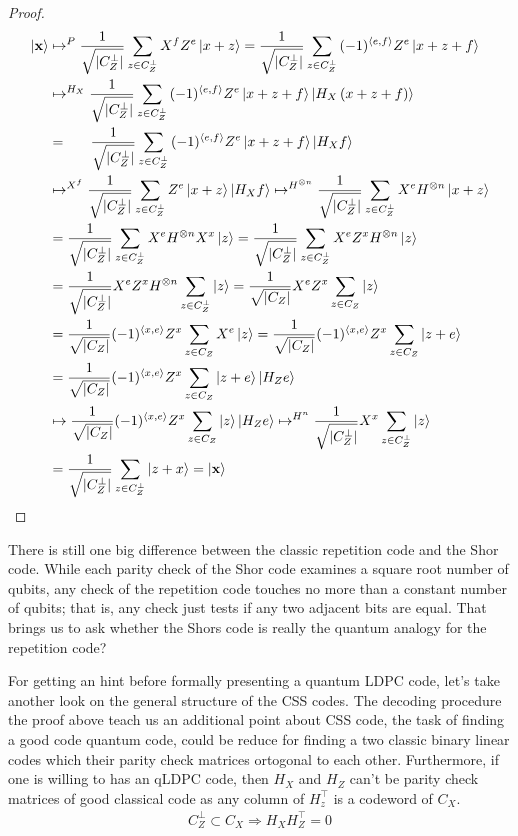 \begin{proof}
      \begin{equation*}
      \begin{split}
        \ket{\mathbf{x}} &  \mapsto^{P}   \frac{1}{\sqrt{|C_{Z}^{\perp}|}} \sum_{z \in C_{Z}^{\perp}}{ X^{f}Z^{e}\ket{ x + z }} = \frac{1}{\sqrt{|C_{Z}^{\perp}|}} \sum_{z \in C_{Z}^{\perp}}{ (-1)^{\braket{e,f} }Z^{e}\ket{ x + z + f}}\\
        & \mapsto^{H_{X}} \GZZZ{ (-1)^{\braket{e,f} }Z^{e}\ket{ x + z + f} \ket{ H_{X} \left(x + z + f\right) }  } \\ 
        & = \ \ \ \ \ \GZZZ{ (-1)^{\braket{e,f} }Z^{e}\ket{ x + z + f} \ket{ H_{X}f }  }\\
        & \mapsto^{X^{f}} \GZZZ{ Z^{e}\ket{ x + z} \ket{ H_{X}f }  }  \mapsto^{H^{\otimes n}} \GZZZ{  X^{e}H^{\otimes n}\ket{ x + z} } \\
        & = \GZZZ{  X^{e}H^{\otimes n} X^{x} \ket{ z} }  = \GZZZ{  X^{e} Z^{x} H^{\otimes n} \ket{ z} } \\
        & = \GZZZW{ \ket{ z} }{X^{e} Z^{x} H^{\otimes n} }  =  \GXXXW{  \ket{ z} }{ X^{e} Z^{x} } \\
        & =  \GXXXW{   X^{e}\ket{ z} }{ (-1)^{\braket{x,e}} Z^{x}}  =  \GXXXW{   \ket{ z + e} }{ (-1)^{\braket{x,e}} Z^{x}} \\
        & =  \GXXXW{   \ket{ z + e} \ket{ H_{Z}e }}{ (-1)^{\braket{x,e}} Z^{x}} \\
        & \mapsto  \GXXXW{   \ket{ z } \ket{ H_{Z}e }}{ (-1)^{\braket{x,e}} Z^{x}} \mapsto^{H^{n}}  \GZZZW{   \ket{ z }}{ X^{x}}\\ 
        & = \GZZZ{ \ket{z + x}} = \ket{\mathbf{x}}
      \end{split}
    \end{equation*}
  \end{proof}
  
  There is still one big difference between the classic repetition code and the Shor code. While each parity check of the Shor code examines a square root number of qubits, any check of the repetition code touches no more than a constant number of qubits; that is, any check just tests if any two adjacent bits are equal.  That brings us to ask whether the Shors code is really the quantum analogy for the repetition code? 

  For getting an hint before formally presenting a quantum LDPC code, let's take another look on the general structure of the CSS codes. The decoding procedure the proof above teach us an additional point about CSS code, the task of finding a good code quantum code, could be reduce for finding a two classic binary linear codes which their parity check matrices ortogonal to each other. Furthermore, if one is willing to has an qLDPC code, then $H_{X}$ and $H_{Z}$ can't be parity check matrices of good classical code as any column of $H_{z}^{\top}$ is a codeword of $C_{X}$. 
  \begin{equation*}
    \begin{split}
      C_{Z}^{\perp} \subset C_{X} \Rightarrow H_{X}H_{Z}^{\top} = 0 
    \end{split}
  \end{equation*}


\ifdefined\CSSDOC

\fi 
